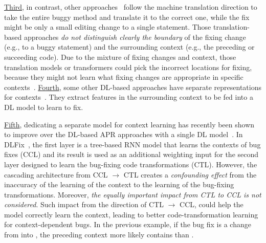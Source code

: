 \underline{Third}, in contrast, other
approaches~\cite{hata2018learning,tufano2019learning,tufano2018empirical}
follow the machine translation direction to take the entire buggy
method and translate it to the correct one, while the fix might be
only a small editing change to a single statement. Those
translation-based approaches {\em do not distinguish clearly the
  boundary} of the fixing change (e.g., to a buggy statement) and the
surrounding context (e.g., the preceding or succeeding code). Due to
the mixture of fixing changes and context, those translation models or
transformers could pick the incorrect locations for fixing, because
they might not learn what fixing changes are appropriate in specific
contexts~\cite{icse20}. \underline{Fourth}, some other DL-based
approaches have separate representations for
contexts~\cite{chen2018sequencer,cure-icse21,lutellier2020coconut}.
They extract features in the surrounding context to be fed into a DL
model to learn to fix.

\underline{Fifth}, dedicating a separate model for context learning
has recently been shown to improve over the DL-based APR approaches
with a single DL model~\cite{icse20}. In DLFix~\cite{icse20}, the
first layer is a tree-based RNN model that learns the contexts of bug
fixes (CCL) and its result is used as an additional weighting input
for the second layer designed to learn the bug-fixing code
transformations (CTL). However, the cascading architecture from CCL
$\rightarrow$ CTL creates a {\em confounding effect} from the inaccuracy of
the learning of the context to the learning of the bug-fixing
transformations. Moreover, {\em the equally important impact from CTL to
CCL is not considered}. Such impact from the direction of CTL
$\rightarrow$ CCL, could help the model correctly learn the context,
leading to better code-transformation learning for context-dependent
bugs. In the previous example, if the bug fix is a change from
 into , the preceding
context more likely contains  than .





